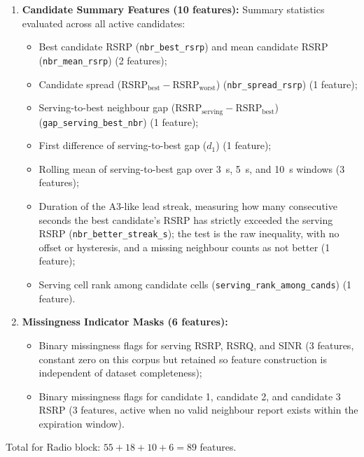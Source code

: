 \begin{enumerate}
    \item \textbf{Candidate Summary Features (10 features):} Summary statistics evaluated across all active candidates:
    \begin{itemize}
        \item Best candidate RSRP (\texttt{nbr\_best\_rsrp}) and mean candidate RSRP (\texttt{nbr\_mean\_rsrp}) (2 features);
        \item Candidate spread ($\text{RSRP}_{\text{best}} - \text{RSRP}_{\text{worst}}$) (\texttt{nbr\_spread\_rsrp}) (1 feature);
        \item Serving-to-best neighbour gap ($\text{RSRP}_{\text{serving}} - \text{RSRP}_{\text{best}}$) (\texttt{gap\_serving\_best\_nbr}) (1 feature);
        \item First difference of serving-to-best gap ($d_1$) (1 feature);
        \item Rolling mean of serving-to-best gap over 3~s, 5~s, and 10~s windows (3 features);
        \item Duration of the A3-like lead streak, measuring how many consecutive seconds the best candidate's RSRP has strictly exceeded the serving RSRP (\texttt{nbr\_better\_streak\_s}); the test is the raw inequality, with no offset or hysteresis, and a missing neighbour counts as not better (1 feature);
        \item Serving cell rank among candidate cells (\texttt{serving\_rank\_among\_cands}) (1 feature).
    \end{itemize}

    \item \textbf{Missingness Indicator Masks (6 features):}
    \begin{itemize}
        \item Binary missingness flags for serving RSRP, RSRQ, and SINR (3 features, constant zero on this corpus but retained so feature construction is independent of dataset completeness);
        \item Binary missingness flags for candidate 1, candidate 2, and candidate 3 RSRP (3 features, active when no valid neighbour report exists within the expiration window).
    \end{itemize}
\end{enumerate}
Total for Radio block: $55 + 18 + 10 + 6 = 89$ features.

